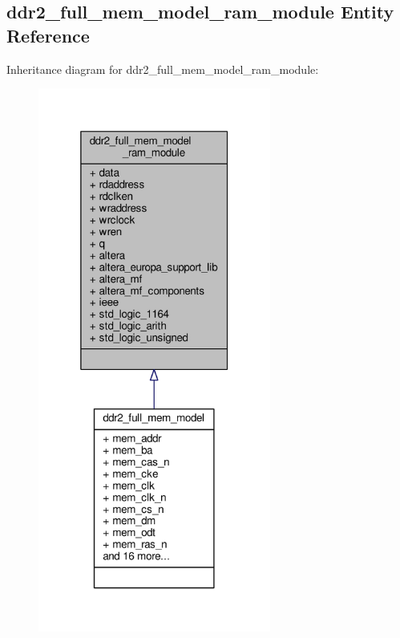 \subsection{ddr2\+\_\+full\+\_\+mem\+\_\+model\+\_\+ram\+\_\+module Entity Reference}
\label{classddr2__full__mem__model__ram__module}


Inheritance diagram for ddr2\+\_\+full\+\_\+mem\+\_\+model\+\_\+ram\+\_\+module\+:\nopagebreak
\begin{figure}[H]
\begin{center}
\leavevmode
\includegraphics[width=217pt]{d2/d0c/classddr2__full__mem__model__ram__module__inherit__graph}
\end{center}
\end{figure}



